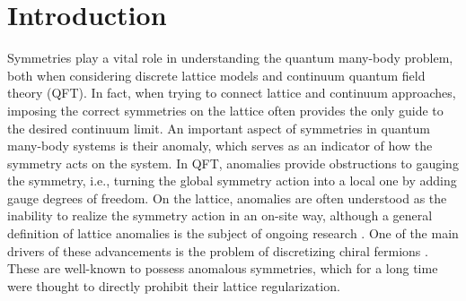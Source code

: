 \documentclass[prx, twocolumn, superscriptaddress, dvipsnames]{revtex4-2}
\theoremstyle{definition}
\begin{document}
\begin{abstract}
Despite recent advances in the lattice representation theory of (generalized) symmetries, many simple quantum spin chains of physical interest are not included in the rigid framework of fusion categories and weak Hopf algebras. We demonstrate that this problem can be overcome by relaxing the requirements on the underlying algebraic structure, and show that general matrix product operator symmetries are described by a pre-bialgebra. As a guiding example, we focus on the anomalous $\mathbb Z_2$ symmetry of the XX model, which manifests the mixed anomaly between its $U(1)$ momentum and winding symmetry. We show how this anomaly is embedded into the non-semisimple corepresentation category, providing a novel mechanism for realizing such anomalous symmetries on the lattice. Additionally, the representation category which describes the renormalization properties is semisimple and semi-monoidal, which provides a new class of mixed state renormalization fixed points. Finally, we show that up to a quantum channel, this anomalous $\mathbb Z_2$ symmetry is equivalent to a more conventional MPO symmetry obtained on the boundary of a double semion model. In this way, our work provides a bridge between well-understood topological defect symmetries and those that arise in more realistic models.
\end{abstract}
\maketitle

\section{Introduction}

Symmetries play a vital role in understanding the quantum many-body problem, both when considering discrete lattice models and continuum quantum field theory (QFT). In fact, when trying to connect lattice and continuum approaches, imposing the correct symmetries on the lattice often provides the only guide to the desired continuum limit. An important aspect of symmetries in quantum many-body systems is their anomaly, which serves as an indicator of how the symmetry acts on the system. In QFT, anomalies provide obstructions to gauging the symmetry, i.e., turning the global symmetry action into a local one by adding gauge degrees of freedom. On the lattice, anomalies are often understood as the inability to realize the symmetry action in an on-site way, although a general definition of lattice anomalies is the subject of ongoing research \cite{Seifnashri:2025vhf,Tu:2025bqf,Shirley:2025yji}. One of the main drivers of these advancements is the problem of discretizing chiral fermions \cite{nielsen1981no,friedan1982proof}. These are well-known to possess anomalous symmetries, which for a long time were thought to directly prohibit their lattice regularization.
\end{document}
